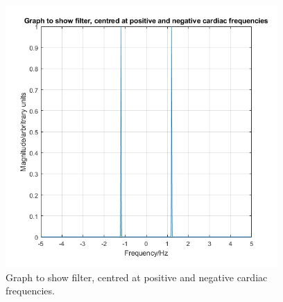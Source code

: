 \documentclass[11pt]{article}
\numberwithin{equation}{section}
\begin{document}
\begin{figure}[H]
    \centering
    \includegraphics[height = 10cm]{./img/q304a.png}
    \caption{Graph to show filter, centred at positive and negative cardiac frequencies.}
    \label{fig:q304a}
\end{figure}
\end{document}

